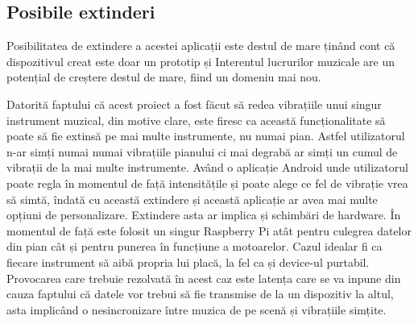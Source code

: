 \documentclass[../IoMusT.tex]{subfiles}
\begin{document}
\subsection{Posibile extinderi}
Posibilitatea de extindere a acestei aplicații este destul de mare ținând cont că dispozitivul creat este doar un prototip și Interentul lucrurilor muzicale are un potențial de creștere destul de mare, fiind un domeniu mai nou.
\\
\par Datorită faptului că acest proiect a fost făcut să redea vibrațiile unui singur instrument muzical, din motive clare, este firesc ca această funcționalitate să poate să fie extinsă pe mai multe instrumente, nu numai pian. Astfel utilizatorul n-ar simți numai numai vibrațiile pianului ci mai degrabă ar simți un cumul de vibrații de la mai multe instrumente. Având o aplicație Android unde utilizatorul poate regla în momentul de față intensitățile și poate alege ce fel de vibrație vrea să simtă, îndată cu această extindere și această aplicație ar avea mai multe opțiuni de personalizare. Extindere asta ar implica și schimbări de hardware. În momentul de față este folosit un singur Raspberry Pi atât pentru culegrea datelor din pian cât și pentru punerea în funcțiune a motoarelor. Cazul idealar fi ca fiecare instrument să aibă propria lui placă, la fel ca și device-ul purtabil. Provocarea care trebuie rezolvată în acest caz este latența care se va inpune din cauza faptului că datele vor trebui să fie transmise de la un dispozitiv la altul, asta implicând o nesincronizare între muzica de pe scenă și vibrațiile simțite.
\end{document}
